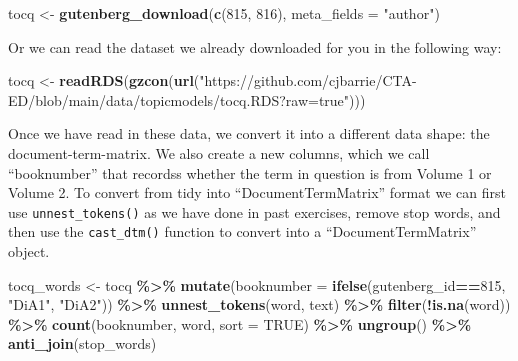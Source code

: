 \documentclass[
]{article}
\newenvironment{Shaded}{\begin{snugshade}}{\end{snugshade}}
\newcommand{\AttributeTok}[1]{\textcolor[rgb]{0.13,0.29,0.53}{#1}}
\newcommand{\ConstantTok}[1]{\textcolor[rgb]{0.56,0.35,0.01}{#1}}
\newcommand{\DecValTok}[1]{\textcolor[rgb]{0.00,0.00,0.81}{#1}}
\newcommand{\FunctionTok}[1]{\textcolor[rgb]{0.13,0.29,0.53}{\textbf{#1}}}
\newcommand{\NormalTok}[1]{#1}
\newcommand{\OtherTok}[1]{\textcolor[rgb]{0.56,0.35,0.01}{#1}}
\newcommand{\SpecialCharTok}[1]{\textcolor[rgb]{0.81,0.36,0.00}{\textbf{#1}}}
\newcommand{\StringTok}[1]{\textcolor[rgb]{0.31,0.60,0.02}{#1}}
\begin{document}
\begin{Shaded}
\begin{Highlighting}[]
\NormalTok{tocq }\OtherTok{\textless{}{-}} \FunctionTok{gutenberg\_download}\NormalTok{(}\FunctionTok{c}\NormalTok{(}\DecValTok{815}\NormalTok{, }\DecValTok{816}\NormalTok{), }
                            \AttributeTok{meta\_fields =} \StringTok{"author"}\NormalTok{)}
\end{Highlighting}
\end{Shaded}

Or we can read the dataset we already downloaded for you in the
following way:

\begin{Shaded}
\begin{Highlighting}[]
\NormalTok{tocq  }\OtherTok{\textless{}{-}} \FunctionTok{readRDS}\NormalTok{(}\FunctionTok{gzcon}\NormalTok{(}\FunctionTok{url}\NormalTok{(}\StringTok{"https://github.com/cjbarrie/CTA{-}ED/blob/main/data/topicmodels/tocq.RDS?raw=true"}\NormalTok{)))}
\end{Highlighting}
\end{Shaded}

Once we have read in these data, we convert it into a different data
shape: the document-term-matrix. We also create a new columns, which we
call ``booknumber'' that recordss whether the term in question is from
Volume 1 or Volume 2. To convert from tidy into ``DocumentTermMatrix''
format we can first use \texttt{unnest\_tokens()} as we have done in
past exercises, remove stop words, and then use the \texttt{cast\_dtm()}
function to convert into a ``DocumentTermMatrix'' object.

\begin{Shaded}
\begin{Highlighting}[]
\NormalTok{tocq\_words }\OtherTok{\textless{}{-}}\NormalTok{ tocq }\SpecialCharTok{\%\textgreater{}\%}
  \FunctionTok{mutate}\NormalTok{(}\AttributeTok{booknumber =} \FunctionTok{ifelse}\NormalTok{(gutenberg\_id}\SpecialCharTok{==}\DecValTok{815}\NormalTok{, }\StringTok{"DiA1"}\NormalTok{, }\StringTok{"DiA2"}\NormalTok{)) }\SpecialCharTok{\%\textgreater{}\%}
  \FunctionTok{unnest\_tokens}\NormalTok{(word, text) }\SpecialCharTok{\%\textgreater{}\%}
  \FunctionTok{filter}\NormalTok{(}\SpecialCharTok{!}\FunctionTok{is.na}\NormalTok{(word)) }\SpecialCharTok{\%\textgreater{}\%}
  \FunctionTok{count}\NormalTok{(booknumber, word, }\AttributeTok{sort =} \ConstantTok{TRUE}\NormalTok{) }\SpecialCharTok{\%\textgreater{}\%}
  \FunctionTok{ungroup}\NormalTok{() }\SpecialCharTok{\%\textgreater{}\%}
  \FunctionTok{anti\_join}\NormalTok{(stop\_words)}
\end{Highlighting}
\end{Shaded}
\end{document}
